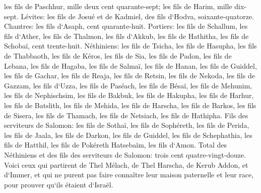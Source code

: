 \verse les fils de Paschhur, mille deux cent quarante-sept; 
\verse les fils de Harim, mille dix-sept. 
\verse Lévites: les fils de Josué et de Kadmiel, des fils d`Hodva, soixante-quatorze. 
\verse Chantres: les fils d`Asaph, cent quarante-huit. 
\verse Portiers: les fils de Schallum, les fils d`Ather, les fils de Thalmon, les fils d`Akkub, les fils de Hathitha, les fils de Schobaï, cent trente-huit. 
\verse Néthiniens: les fils de Tsicha, les fils de Hasupha, les fils de Thabbaoth, 
\verse les fils de Kéros, les fils de Sia, les fils de Padon, 
\verse les fils de Lebana, les fils de Hagaba, les fils de Salmaï, 
\verse les fils de Hanan, les fils de Guiddel, les fils de Gachar, 
\verse les fils de Reaja, les fils de Retsin, les fils de Nekoda, 
\verse les fils de Gazzam, les fils d`Uzza, les fils de Paséach, 
\verse les fils de Bésaï, les fils de Mehunim, les fils de Nephischsim, 
\verse les fils de Bakbuk, les fils de Hakupha, les fils de Harhur, 
\verse les fils de Batslith, les fils de Mehida, les fils de Harscha, 
\verse les fils de Barkos, les fils de Sisera, les fils de Thamach, 
\verse les fils de Netsiach, les fils de Hathipha. 
\verse Fils des serviteurs de Salomon: les fils de Sothaï, les fils de Sophéreth, les fils de Perida, 
\verse les fils de Jaala, les fils de Darkon, les fils de Guiddel, 
\verse les fils de Schephathia, les fils de Hatthil, les fils de Pokéreth Hatsebaïm, les fils d`Amon. 
\verse Total des Néthiniens et des fils des serviteurs de Salomon: trois cent quatre-vingt-douze. 
\verse Voici ceux qui partirent de Thel Mélach, de Thel Harscha, de Kerub Addon, et d`Immer, et qui ne purent pas faire connaître leur maison paternelle et leur race, pour prouver qu`ils étaient d`Israël. 
